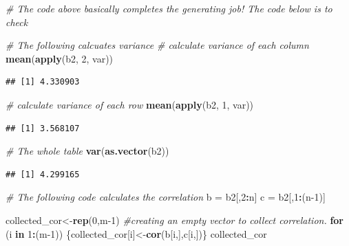 \documentclass[
]{book}
\newenvironment{Shaded}{\begin{snugshade}}{\end{snugshade}}
\newcommand{\CommentTok}[1]{\textcolor[rgb]{0.56,0.35,0.01}{\textit{#1}}}
\newcommand{\ControlFlowTok}[1]{\textcolor[rgb]{0.13,0.29,0.53}{\textbf{#1}}}
\newcommand{\DecValTok}[1]{\textcolor[rgb]{0.00,0.00,0.81}{#1}}
\newcommand{\KeywordTok}[1]{\textcolor[rgb]{0.13,0.29,0.53}{\textbf{#1}}}
\newcommand{\NormalTok}[1]{#1}
\newcommand{\OperatorTok}[1]{\textcolor[rgb]{0.81,0.36,0.00}{\textbf{#1}}}
\newcommand{\StringTok}[1]{\textcolor[rgb]{0.31,0.60,0.02}{#1}}
\begin{document}
\begin{Shaded}
\begin{Highlighting}[]
\CommentTok{# The code above basically completes the generating job! The code below is to check }

\CommentTok{# The following calcuates variance}
\CommentTok{# calculate variance of each column}
\KeywordTok{mean}\NormalTok{(}\KeywordTok{apply}\NormalTok{(b2, }\DecValTok{2}\NormalTok{, var))}
\end{Highlighting}
\end{Shaded}

\begin{verbatim}
## [1] 4.330903
\end{verbatim}

\begin{Shaded}
\begin{Highlighting}[]
\CommentTok{# calculate variance of each row}
\KeywordTok{mean}\NormalTok{(}\KeywordTok{apply}\NormalTok{(b2, }\DecValTok{1}\NormalTok{, var))}
\end{Highlighting}
\end{Shaded}

\begin{verbatim}
## [1] 3.568107
\end{verbatim}

\begin{Shaded}
\begin{Highlighting}[]
\CommentTok{# The whole table}
\KeywordTok{var}\NormalTok{(}\KeywordTok{as.vector}\NormalTok{(b2))}
\end{Highlighting}
\end{Shaded}

\begin{verbatim}
## [1] 4.299165
\end{verbatim}

\begin{Shaded}
\begin{Highlighting}[]
\CommentTok{# The following code calculates the correlation }
\NormalTok{b =}\StringTok{ }\NormalTok{b2[,}\DecValTok{2}\OperatorTok{:}\NormalTok{n]}
\NormalTok{c =}\StringTok{ }\NormalTok{b2[,}\DecValTok{1}\OperatorTok{:}\NormalTok{(n}\DecValTok{-1}\NormalTok{)]}

\NormalTok{collected_cor<-}\KeywordTok{rep}\NormalTok{(}\DecValTok{0}\NormalTok{,m}\DecValTok{-1}\NormalTok{) }\CommentTok{#creating an empty vector to collect correlation. }
\ControlFlowTok{for}\NormalTok{ (i }\ControlFlowTok{in} \DecValTok{1}\OperatorTok{:}\NormalTok{(m}\DecValTok{-1}\NormalTok{))}
\NormalTok{\{collected_cor[i]<-}\KeywordTok{cor}\NormalTok{(b[i,],c[i,])\}}
\NormalTok{collected_cor}
\end{Highlighting}
\end{Shaded}
\end{document}
